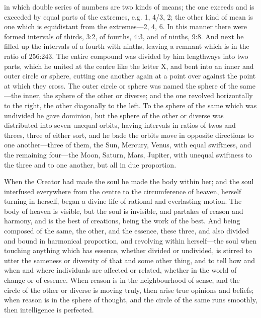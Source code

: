 \documentclass[11pt,letter]{article}
\begin{document}
\par  in which double series of numbers are two kinds of means; the one exceeds and is exceeded by equal parts of the extremes, e.g. 1, 4/3, 2; the other kind of mean is one which is equidistant from the extremes—2, 4, 6. In this manner there were formed intervals of thirds, 3:2, of fourths, 4:3, and of ninths, 9:8. And next he filled up the intervals of a fourth with ninths, leaving a remnant which is in the ratio of 256:243. The entire compound was divided by him lengthways into two parts, which he united at the centre like the letter X, and bent into an inner and outer circle or sphere, cutting one another again at a point over against the point at which they cross. The outer circle or sphere was named the sphere of the same—the inner, the sphere of the other or diverse; and the one revolved horizontally to the right, the other diagonally to the left. To the sphere of the same which was undivided he gave dominion, but the sphere of the other or diverse was distributed into seven unequal orbits, having intervals in ratios of twos and threes, three of either sort, and he bade the orbits move in opposite directions to one another—three of them, the Sun, Mercury, Venus, with equal swiftness, and the remaining four—the Moon, Saturn, Mars, Jupiter, with unequal swiftness to the three and to one another, but all in due proportion.

\par  When the Creator had made the soul he made the body within her; and the soul interfused everywhere from the centre to the circumference of heaven, herself turning in herself, began a divine life of rational and everlasting motion. The body of heaven is visible, but the soul is invisible, and partakes of reason and harmony, and is the best of creations, being the work of the best. And being composed of the same, the other, and the essence, these three, and also divided and bound in harmonical proportion, and revolving within herself—the soul when touching anything which has essence, whether divided or undivided, is stirred to utter the sameness or diversity of that and some other thing, and to tell how and when and where individuals are affected or related, whether in the world of change or of essence. When reason is in the neighbourhood of sense, and the circle of the other or diverse is moving truly, then arise true opinions and beliefs; when reason is in the sphere of thought, and the circle of the same runs smoothly, then intelligence is perfected.
\end{document}
